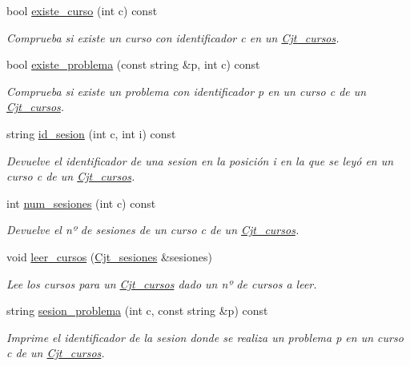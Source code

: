 \begin{DoxyCompactItemize}
bool \mbox{\hyperlink{class_cjt__cursos_aed873ef8285d1f33c391bd4d808185de}{existe\+\_\+curso}} (int c) const
\begin{DoxyCompactList}\small\item\em Comprueba si existe un curso con identificador c en un \mbox{\hyperlink{class_cjt__cursos}{Cjt\+\_\+cursos}}. \end{DoxyCompactList}\item 
bool \mbox{\hyperlink{class_cjt__cursos_a7b2a3da42d49f10bd6413fa00dbe9012}{existe\+\_\+problema}} (const string \&p, int c) const
\begin{DoxyCompactList}\small\item\em Comprueba si existe un problema con identificador p en un curso c de un \mbox{\hyperlink{class_cjt__cursos}{Cjt\+\_\+cursos}}. \end{DoxyCompactList}\item 
string \mbox{\hyperlink{class_cjt__cursos_acbc9b738ae2d1ba8ba2633aa57561fcb}{id\+\_\+sesion}} (int c, int i) const
\begin{DoxyCompactList}\small\item\em Devuelve el identificador de una sesion en la posición i en la que se leyó en un curso c de un \mbox{\hyperlink{class_cjt__cursos}{Cjt\+\_\+cursos}}. \end{DoxyCompactList}\item 
int \mbox{\hyperlink{class_cjt__cursos_a3a8c9c5eecbdab5e1702233dab4d725b}{num\+\_\+sesiones}} (int c) const
\begin{DoxyCompactList}\small\item\em Devuelve el nº de sesiones de un curso c de un \mbox{\hyperlink{class_cjt__cursos}{Cjt\+\_\+cursos}}. \end{DoxyCompactList}\item 
void \mbox{\hyperlink{class_cjt__cursos_a71a9a083e2abceee34329462a804637a}{leer\+\_\+cursos}} (\mbox{\hyperlink{class_cjt__sesiones}{Cjt\+\_\+sesiones}} \&sesiones)
\begin{DoxyCompactList}\small\item\em Lee los cursos para un \mbox{\hyperlink{class_cjt__cursos}{Cjt\+\_\+cursos}} dado un nº de cursos a leer. \end{DoxyCompactList}\item 
string \mbox{\hyperlink{class_cjt__cursos_acc9074c9338d31947bdd84e3498580be}{sesion\+\_\+problema}} (int c, const string \&p) const
\begin{DoxyCompactList}\small\item\em Imprime el identificador de la sesion donde se realiza un problema p en un curso c de un \mbox{\hyperlink{class_cjt__cursos}{Cjt\+\_\+cursos}}. \end{DoxyCompactList}\item 

\end{DoxyCompactItemize}
